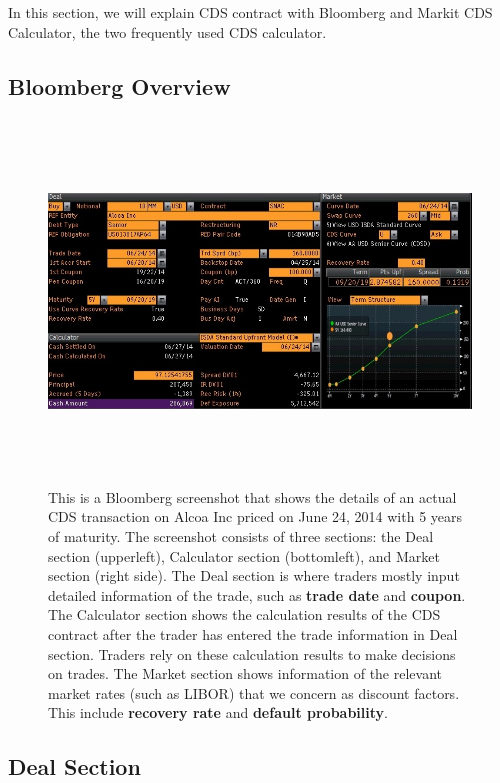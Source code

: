\documentclass{jss}
\begin{document}
In this section, we will explain CDS contract with Bloomberg and Markit CDS Calculator, the two frequently used CDS calculator.

\subsection{Bloomberg Overview}
\label{subsec:Bloomberg}

\begin{figure}[H]
\centering
\includegraphics[width=6.3in, height=3.8in]{images/AlcoaIncCDS.jpg}
\caption{This is a Bloomberg screenshot that shows the details of an actual CDS transaction on Alcoa Inc priced on June 24, 2014 with 5 years of maturity. The screenshot consists of three sections: the Deal section (upperleft), Calculator section (bottomleft), and Market section (right side). The Deal section is where traders mostly input detailed information of the trade, such as \textbf{trade date} and \textbf{coupon}. The Calculator section shows the calculation results of the CDS contract after the trader has entered the trade information in Deal section. Traders rely on these calculation results to make decisions on trades. The Market section shows information of the relevant market rates (such as LIBOR) that we concern as discount factors. This include \textbf{recovery rate} and \textbf{default probability}.}
\label{AlcoaIncCDS}
\end{figure}

\subsection{Deal Section}
\end{document}
